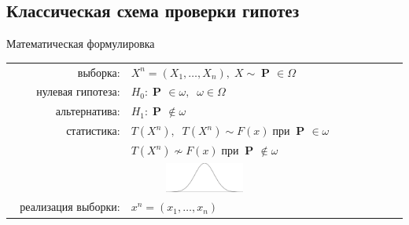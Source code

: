 \documentclass[9pt,pdf,utf8,hyperref={unicode},aspectratio=169]{beamer}
\DeclareMathOperator{\prob}{\mathbf{P}\!}
\begin{document}
\subsection{Классическая схема проверки гипотез}
\begin{frame}{Математическая формулировка}
		\begin{center}
	\vspace{-10pt}
	\begin{tabular}{rl}
		выборка:                        & $X^n=\left(X_1,\ldots,X_n\right), \; X \sim \prob \in \Omega$         \\
		нулевая гипотеза:               & $H_0\colon \prob\in\omega, \;\; \omega\in\Omega$ \\
		альтернатива:                   & $H_1\colon \prob\notin\omega$ \\
		статистика:                     & $T\left(X^n\right), \;\; T\left(X^n\right)\sim F\left(x\right) \;\text{при}\; \prob\in\omega$ \\
		& \;\;\;\;\;\;\;\;\;\;\;\;\;\; $T\left(X^n\right)\not\sim F\left(x\right) \;\text{при}\; \prob\notin\omega$ \\
		\multicolumn{2}{c}{\includegraphics[width=0.2\textwidth]{stats1.png}} \\
		реализация выборки:             & $x^n=\left(x_1,\ldots,x_n\right)$ \\

\end{tabular}
\end{center}
\end{frame}
\end{document}
